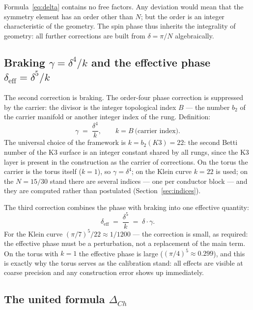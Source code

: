 \begin{remark}
Formula~\eqref{eq:delta} contains no free factors. Any deviation
would mean that the symmetry element has an order other than $N$;
but the order is an integer characteristic of the geometry. The
spin phase thus inherits the integrality of geometry: all further
corrections are built from $\delta=\pi/N$ algebraically.
\end{remark}

\subsection{Braking $\gamma=\delta^4/k$ and the effective phase
$\delta_{\mathrm{eff}}=\delta^5/k$}

The second correction is braking. The order-four phase correction
is suppressed by the carrier: the divisor is the integer
topological index $B$ --- the number $b_2$ of the carrier manifold
or another integer index of the rung. Definition:
\begin{equation}\label{eq:gamma}
  \gamma \;=\; \frac{\delta^4}{k},
  \qquad k = B\ \text{(carrier index)}.
\end{equation}
The universal choice of the framework is $k=b_2(K3)=22$: the second
Betti number of the K3 surface is an integer constant shared by all
rungs, since the K3 layer is present in the construction as the
carrier of corrections. On the torus the carrier is the torus itself
($k=1$), so $\gamma=\delta^4$; on the Klein curve $k=22$ is used; on
the $N=15/30$ stand there are several indices --- one per conductor
block --- and they are computed rather than postulated
(Section~\ref{sec:indices}).

The third correction combines the phase with braking into one
effective quantity:
\begin{equation}\label{eq:deff}
  \delta_{\mathrm{eff}} \;=\; \frac{\delta^5}{k} \;=\; \delta\cdot\gamma.
\end{equation}
For the Klein curve $(\pi/7)^5/22\approx1/1200$ --- the correction
is small, as required: the effective phase must be a perturbation,
not a replacement of the main term. On the torus with $k=1$ the
effective phase is large ($(\pi/4)^5\approx0.299$), and this is
exactly why the torus serves as the calibration stand: all effects
are visible at coarse precision and any construction error shows up
immediately.

\subsection{The united formula $\Delta_{Ch}$}

